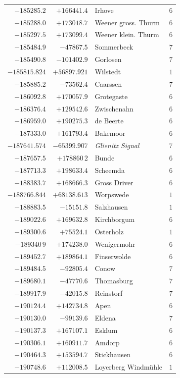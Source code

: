 \begin{center}
\begin{tabular}{r|r|p{170pt}|r}
\(-185285.2\)&\(+166441.4\)&Irhove&\(6\)\\
\(-185288.0\)&\(+173018.7\)&Weener gross. Thurm&\(6\)\\
\(-185297.5\)&\(+173099.4\)&Weener klein. Thurm&\(6\)\\
\(-185484.9\)&\(-47867.5\)&Sommerbeck&\(7\)\\
\(-185490.8\)&\(-101402.9\)&Gorlosen&\(7\)\\
\(-185815.824\)&\(+56897.921\)&Wilstedt&\(1\)\\
\(-185885.2\)&\(-73562.4\)&Caarssen&\(7\)\\
\(-186092.8\)&\(+170057.9\)&Grotegaste&\(6\)\\
\(-186376.4\)&\(+129542.6\)&Zwischenahn&\(6\)\\
\(-186959.0\)&\(+190275.3\)&de Beerte&\(6\)\\
\(-187333.0\)&\(+161793.4\)&Bakemoor&\(6\)\\
\(-187641.574\)&\(-65399.907\)&\textit{Glienitz Signal}&\(7\)\\
\(-187657.5\)&\(+178860\,2\)&Bunde&\(6\)\\
\(-187713.3\)&\(+198633.4\)&Scheemda&\(6\)\\
\(-188383.7\)&\(+168666.3\)&Gross Driver&\(6\)\\
\(-188766.844\)&\(+68138.613\)&Worpswede&\(1\)\\
\(-188883.5\)&\(-15151.8\)&Salzhausen&\(1\)\\
\(-189022.6\)&\(+169632.8\)&Kirchborgum&\(6\)\\
\(-189300.6\)&\(+75524.1\)&Osterholz&\(1\)\\
\(-189340\,9\)&\(+174238.0\)&Wenigermohr&\(6\)\\
\(-189452.7\)&\(+189864.1\)&Finserwolde&\(6\)\\
\(-189484.5\)&\(-92805.4\)&Conow&\(7\)\\
\(-189680.1\)&\(-47770.6\)&Thomasburg&\(7\)\\
\(-189917.9\)&\(-42015.8\)&Reinstorf&\(7\)\\
\(-190124.4\)&\(+142734.8\)&Apen&\(6\)\\
\(-190130.0\)&\(-99139.6\)&Eldena&\(7\)\\
\(-190137.3\)&\(+167107.1\)&Esklum&\(6\)\\
\(-190306.1\)&\(+160911.7\)&Amdorp&\(6\)\\
\(-190464.3\)&\(+153594.7\)&Stickhausen&\(6\)\\
\(-190748.6\)&\(+112008.5\)&Loyerberg Windmühle&\(1\)\\
\hline\end{tabular}\endgroup\end{center}
